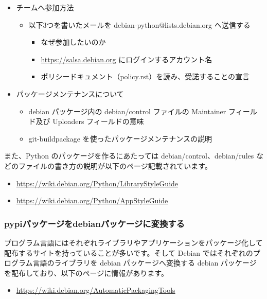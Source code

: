 \documentclass[mingoth,a4paper]{jsarticle}
\begin{document}
\begin{itemize}
\item チームへ参加方法
  \begin{itemize}
  \item 以下3つを書いたメールを debian-python@lists.debian.org へ送信する
    \begin{itemize}
    \item なぜ参加したいのか
    \item \url{https://salsa.debian.org} にログインするアカウント名
    \item ポリシードキュメント（policy.rst）を読み、受諾することの宣言
    \end{itemize}
  \end{itemize}
\item パッケージメンテナンスについて
  \begin{itemize}
  \item debian パッケージ内の debian/control ファイルの Maintainer フィールド及び Uploaders フィールドの意味
  \item git-buildpackage を使ったパッケージメンテナンスの説明
  \end{itemize}
\end{itemize}

また、Python のパッケージを作るにあたっては debian/control、debian/rules などのファイルの書き方の説明が以下のページ記載されています。

\begin{itemize}
\item \url{https://wiki.debian.org/Python/LibraryStyleGuide}
\item \url{https://wiki.debian.org/Python/AppStyleGuide}
\end{itemize}


\subsubsection{pypiパッケージをdebianパッケージに変換する}

プログラム言語にはそれぞれライブラリやアプリケーションをパッケージ化して配布するサイトを持っていることが多いです。そして Debian ではそれぞれのプログラム言語のライブラリを debian パッケージへ変換する debian パッケージを配布しており、以下のページに情報があります。

\begin{itemize}
\item \url{https://wiki.debian.org/AutomaticPackagingTools}
\end{itemize}
    
\end{document}
